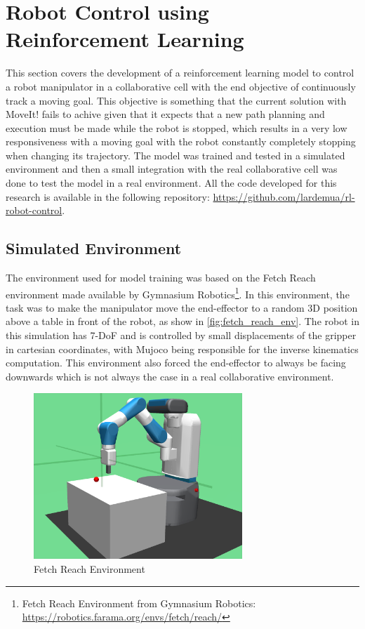 \section{Robot Control using Reinforcement Learning}

This section covers the development of a reinforcement learning model to control a robot manipulator in a collaborative cell with the end objective of continuously track a moving goal. This objective is something that the current solution with MoveIt! fails to achive given that it expects that a new path planning and execution must be made while the robot is stopped, which results in a very low responsiveness with a moving goal with the robot constantly completely stopping when changing its trajectory. The model was trained and tested in a simulated environment and then a small integration with the real collaborative cell was done to test the model in a real environment. All the code developed for this research is available in the following repository: \url{https://github.com/lardemua/rl-robot-control}.

\subsection{Simulated Environment}

The environment used for model training was based on the Fetch Reach environment made available by Gymnasium Robotics\footnote{Fetch Reach Environment from Gymnasium Robotics: \url{https://robotics.farama.org/envs/fetch/reach/}}. In this environment, the task was to make the manipulator move the end-effector to a random 3D position above a table in front of the robot, as show in \autoref{fig:fetch_reach_env}. The robot in this simulation has 7-DoF and is controlled by small displacements of the gripper in cartesian coordinates, with Mujoco being responsible for the inverse kinematics computation. This environment also forced the end-effector to always be facing downwards which is not always the case in a real collaborative environment.

\begin{figure}[H]%
    \centerline{\includegraphics[width=0.7\textwidth]{figs/fetch_reach.png}}
    \caption[Fetch Reach Environment]{Fetch Reach Environment}
    \label{fig:fetch_reach_env}
\end{figure}

